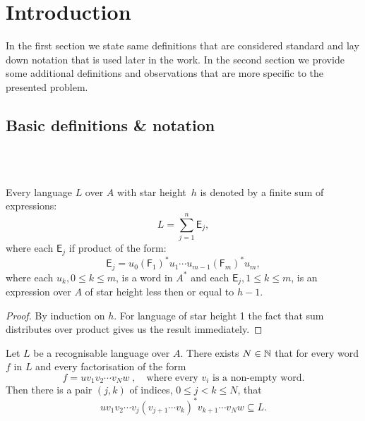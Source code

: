 \chapter{Introduction}

In the first section we state same definitions that are considered standard and lay down notation that is used later in the work. In the second section we provide some additional definitions and observations that are more specific to the presented problem.

\section{Basic definitions \& notation}

\begin{defn} \\
    \\
\end{defn}

\begin{defn}
\end{defn}

\begin{lemma}\label{lm:star_height_distributivity}
    Every language $L$ over $A$ with star height~$h$ is denoted by a finite sum of expressions:
    \[
        L = \sum_{j=1}^n \mathsf{E}_j,
    \]
    where each $\mathsf{E}_j$ if product of the form:
    \[
        \mathsf{E}_j = u_0{(\mathsf{F}_1)}^*u_1 \dotsm u_{m-1}{(\mathsf{F}_m)}^*u_m,
    \]
    where each $u_k, 0 \leq k \leq m$, is a word in $A^*$ and each $\mathsf{E}_j, 1 \leq k \leq m$, is an expression over $A$ of star height less then or equal to $h-1$.
\end{lemma}

\begin{proof}
    By induction on $h$. For language of star height 1 the fact that sum distributes over product gives us the result immediately. 
\end{proof}

\begin{lemma}\label{lm:block_star_lemma}
    Let $L$ be a recognisable language over $A$. There exists $N \in \mathbb{N}$ that for every word $f$ in $L$ and every factorisation of the form
    \[
        f = u v_1 v_2 \dotsm v_N w \; , \quad \text{where every $v_i$ is a non-empty word.}
    \]
    Then there is a pair $(j,k)$ of indices, $0 \leq j < k \leq N$, that
    \[
        u v_1 v_2 \dotsm v_j {(v_{j+1} \dotsm v_k)}^* v_{k+1} \dotsm v_N w \subseteq L.
    \]
\end{lemma}

